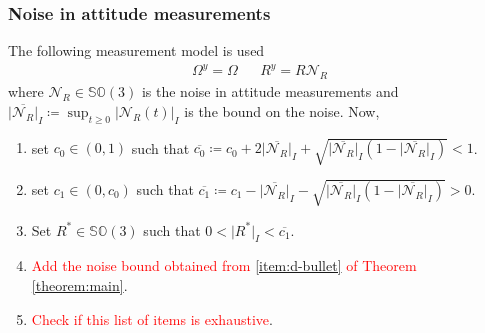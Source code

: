 \documentclass{article}
\newcommand{\SOthree}{\mathbb{SO}(3)}
\newcommand{\Omegay}{\Omega^y}
\newcommand{\normSOthree}[1]{{{\vert}#1 {\vert}_I}}
\newcommand{\noiseatt}{\mathcal{N}_R}
\newcommand{\maxnoiseatt}{\normSOthree{\overline{\noiseatt}}}
\newcommand{\cobar}{\overline{c_0}}
\begin{document}
\subsubsection{Noise in attitude measurements}
The following measurement model is used
\begin{align}\label{eq:measurement_model_ISS_att}
    \Omegay = \Omega  && R^y = R \noiseatt
\end{align}
where $\noiseatt\in\SOthree$ is the noise in attitude measurements and $\maxnoiseatt\coloneqq \sup_{t\geq 0}\normSOthree{\noiseatt(t)}$ is the bound on the noise.  Now,
\begin{enumerate}[label={(\Alph*)}]
    \item set $c_0\in(0,1)$ such that $\cobar\coloneqq c_0 + 2\maxnoiseatt + \sqrt{\maxnoiseatt(1-\maxnoiseatt)}  < 1 $. \label{item-A}
    \item set $c_1\in (0,c_0)$ such that $\overline{c_1} \coloneqq c_1 - \maxnoiseatt - \sqrt{\maxnoiseatt(1-\maxnoiseatt)} > 0$.\label{item-B}
    \item Set $R^*\in\SOthree$ such that $0 < \normSOthree{R^*} < \overline{c_1}$. \label{item-C}
    \item \textcolor{red}{Add the noise bound obtained from \ref{item:d-bullet} of Theorem \ref{theorem:main}}. 
    \item \textcolor{red}{Check if this list of items is exhaustive}. 
\end{enumerate}
\end{document}
